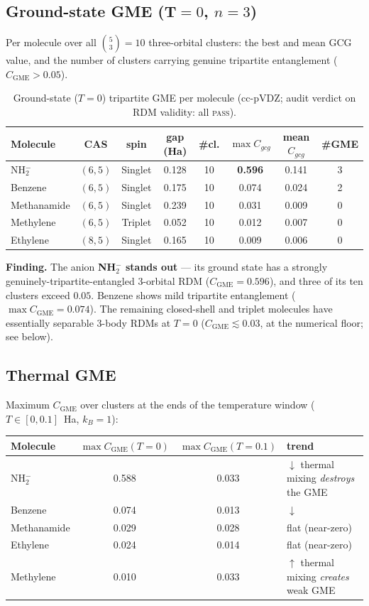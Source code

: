 \documentclass[11pt]{article}
\newcommand{\CGME}{\ensuremath{C_{\mathrm{GME}}}}
\begin{document}
\subsection{Ground-state GME (T$=0$, $n=3$)}
Per molecule over all $\binom{5}{3}=10$ three-orbital clusters: the best and mean
GCG value, and the number of clusters carrying genuine tripartite entanglement
($\CGME>0.05$).

\begin{longtable}{@{}lcccccc c@{}}
\caption{Ground-state ($T=0$) tripartite GME per molecule
(cc-pVDZ; audit verdict on RDM validity: all \textsc{pass}).}\label{tab:t0}\\
\toprule
Molecule & CAS & spin & gap (Ha) & \#cl. & $\max C_{gcg}$ & mean $C_{gcg}$ & \#GME \\
\midrule \endhead
NH$_2^-$    & $(6,5)$ & Singlet & 0.128 & 10 & \textbf{0.596} & 0.141 & 3 \\
Benzene     & $(6,5)$ & Singlet & 0.175 & 10 & 0.074 & 0.024 & 2 \\
Methanamide & $(6,5)$ & Singlet & 0.239 & 10 & 0.031 & 0.009 & 0 \\
Methylene   & $(6,5)$ & Triplet & 0.052 & 10 & 0.012 & 0.007 & 0 \\
Ethylene    & $(8,5)$ & Singlet & 0.165 & 10 & 0.009 & 0.006 & 0 \\
\bottomrule
\end{longtable}

\noindent\textbf{Finding.} The anion \textbf{NH$_2^-$ stands out} --- its ground
state has a strongly genuinely-tripartite-entangled 3-orbital RDM
($\CGME=0.596$), and three of its ten clusters exceed $0.05$. Benzene shows mild
tripartite entanglement ($\max\CGME=0.074$). The remaining closed-shell and
triplet molecules have essentially separable 3-body RDMs at $T=0$
($\CGME\lesssim0.03$, at the numerical floor; see below).

\subsection{Thermal GME}
Maximum $\CGME$ over clusters at the ends of the temperature window
($T\in[0,0.1]$~Ha, $k_B{=}1$):

\begin{center}
\begin{tabular}{@{}lccl@{}}
\toprule
Molecule & $\max\CGME(T{=}0)$ & $\max\CGME(T{=}0.1)$ & trend \\
\midrule
NH$_2^-$    & 0.588 & 0.033 & $\downarrow$ thermal mixing \emph{destroys} the GME \\
Benzene     & 0.074 & 0.013 & $\downarrow$ \\
Methanamide & 0.029 & 0.028 & flat (near-zero) \\
Ethylene    & 0.024 & 0.014 & flat (near-zero) \\
Methylene   & 0.010 & 0.033 & $\uparrow$ thermal mixing \emph{creates} weak GME \\
\bottomrule
\end{tabular}
\end{center}
\end{document}
